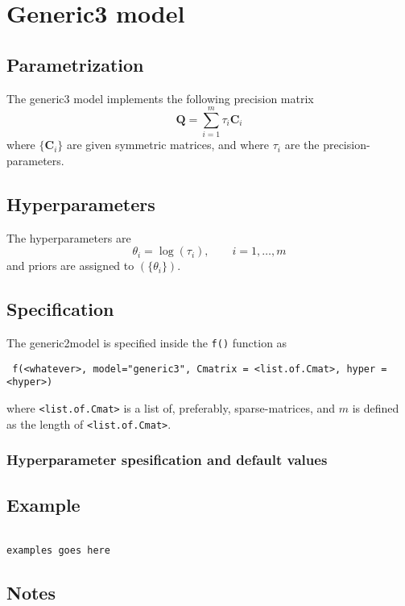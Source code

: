 \documentclass[a4paper,11pt]{article}
\def\mm#1{\ensuremath{\boldsymbol{#1}}} %
\begin{document}
\section*{Generic3 model}

\subsection*{Parametrization}

The generic3 model implements the following precision matrix
\begin{equation}\label{eq1}%
    \mathbf{Q}= \sum_{i = 1}^{m} \tau_i \mm{C}_i
\end{equation}
where  $\{\mm{C}_i\}$ are given symmetric matrices, and where
$\tau_i$ are the precision-parameters.

\subsection*{Hyperparameters}

The hyperparameters are 
\begin{displaymath}
    \theta_i = \log(\tau_i), \qquad i=1, \ldots, m
\end{displaymath}
and priors are assigned to $(\{\theta_i\})$.

\subsection*{Specification}

The generic2model is specified inside the {\tt f()} function as
\begin{verbatim}
 f(<whatever>, model="generic3", Cmatrix = <list.of.Cmat>, hyper = <hyper>)
\end{verbatim}
where {\tt <list.of.Cmat>} is a list of, preferably, sparse-matrices,
and $m$ is defined as the length of {\tt <list.of.Cmat>}.

\subsubsection*{Hyperparameter spesification and default values}


\subsection*{Example}
{\small\begin{verbatim}

examples goes here
\end{verbatim}
}


\subsection*{Notes}
\end{document}
